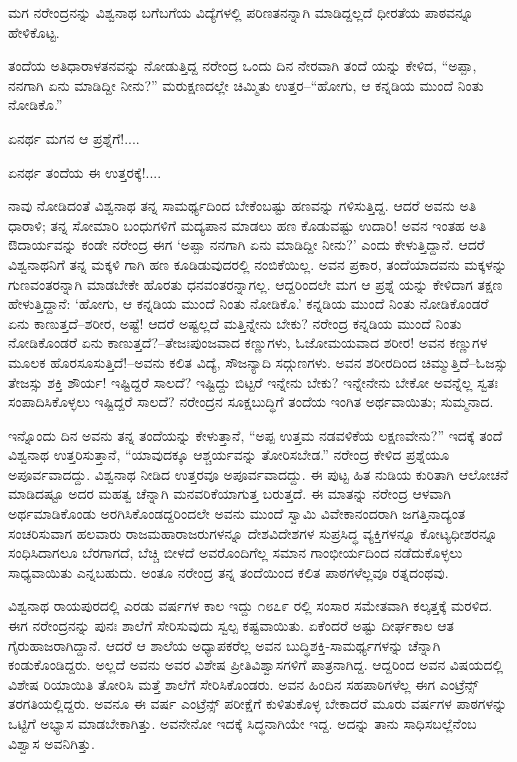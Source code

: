 ಮಗ ನರೇಂದ್ರನನ್ನು ವಿಶ್ವನಾಥ ಬಗೆಬಗೆಯ ವಿದ್ಯೆಗಳಲ್ಲಿ ಪರಿಣತನನ್ನಾಗಿ ಮಾಡಿದ್ದಲ್ಲದೆ ಧೀರತೆಯ ಪಾಠವನ್ನೂ ಹೇಳಿಕೊಟ್ಟ.

ತಂದೆಯ ಅತಿಧಾರಾಳತನವನ್ನು ನೋಡುತ್ತಿದ್ದ ನರೇಂದ್ರ ಒಂದು ದಿನ ನೇರವಾಗಿ ತಂದೆ ಯನ್ನು ಕೇಳಿದ, “ಅಪ್ಪಾ, ನನಗಾಗಿ ಏನು ಮಾಡಿದ್ದೀ ನೀನು?” ಮರುಕ್ಷಣದಲ್ಲೇ ಚಿಮ್ಮಿತು ಉತ್ತರ–“ಹೋಗು, ಆ ಕನ್ನಡಿಯ ಮುಂದೆ ನಿಂತು ನೋಡಿಕೊ.”

ಏನರ್ಥ ಮಗನ ಆ ಪ್ರಶ್ನೆಗೆ!....

ಏನರ್ಥ ತಂದೆಯ ಈ ಉತ್ತರಕ್ಕೆ!....

ನಾವು ನೋಡಿದಂತೆ ವಿಶ್ವನಾಥ ತನ್ನ ಸಾಮರ್ಥ್ಯದಿಂದ ಬೇಕೆಂಬಷ್ಟು ಹಣವನ್ನು ಗಳಿಸುತ್ತಿದ್ದ. ಆದರೆ ಅವನು ಅತಿ ಧಾರಾಳಿ; ತನ್ನ ಸೋಮಾರಿ ಬಂಧುಗಳಿಗೆ ಮದ್ಯಪಾನ ಮಾಡಲು ಹಣ ಕೊಡುವಷ್ಟು ಉದಾರಿ! ಅವನ ಇಂತಹ ಅತಿ ಔದಾರ್ಯವನ್ನು ಕಂಡೇ ನರೇಂದ್ರ ಈಗ ‘ಅಪ್ಪಾ ನನಗಾಗಿ ಏನು ಮಾಡಿದ್ದೀ ನೀನು?’ ಎಂದು ಕೇಳುತ್ತಿದ್ದಾನೆ. ಆದರೆ ವಿಶ್ವನಾಥನಿಗೆ ತನ್ನ ಮಕ್ಕಳಿ ಗಾಗಿ ಹಣ ಕೂಡಿಡುವುದರಲ್ಲಿ ನಂಬಿಕೆಯಿಲ್ಲ. ಅವನ ಪ್ರಕಾರ, ತಂದೆಯಾದವನು ಮಕ್ಕಳನ್ನು ಗುಣವಂತರನ್ನಾಗಿ ಮಾಡಬೇಕೇ ಹೊರತು ಧನವಂತರನ್ನಾಗಲ್ಲ. ಆದ್ದರಿಂದಲೇ ಮಗ ಆ ಪ್ರಶ್ನೆ ಯನ್ನು ಕೇಳಿದಾಗ ತಕ್ಷಣ ಹೇಳುತ್ತಿದ್ದಾನೆ: ‘ಹೋಗು, ಆ ಕನ್ನಡಿಯ ಮುಂದೆ ನಿಂತು ನೋಡಿಕೊ.’ ಕನ್ನಡಿಯ ಮುಂದೆ ನಿಂತು ನೋಡಿಕೊಂಡರೆ ಏನು ಕಾಣುತ್ತದೆ–ಶರೀರ, ಅಷ್ಟೆ! ಆದರೆ ಅಷ್ಟಲ್ಲದೆ ಮತ್ತಿನ್ನೇನು ಬೇಕು? ನರೇಂದ್ರ ಕನ್ನಡಿಯ ಮುಂದೆ ನಿಂತು ನೋಡಿಕೊಂಡರೆ ಏನು ಕಾಣುತ್ತದೆ?–ತೇಜಃಪುಂಜವಾದ ಕಣ್ಣುಗಳು, ಓಜೋಮಯವಾದ ಶರೀರ! ಅವನ ಕಣ್ಣುಗಳ ಮೂಲಕ ಹೊರಸೂಸುತ್ತಿದೆ!–ಅವನು ಕಲಿತ ವಿದ್ಯೆ, ಸೌಜನ್ಯಾದಿ ಸದ್ಗುಣಗಳು. ಅವನ ಶರೀರದಿಂದ ಚಿಮ್ಮುತ್ತಿದೆ–ಓಜಸ್ಸು ತೇಜಸ್ಸು ಶಕ್ತಿ ಶೌರ್ಯ! ಇಷ್ಟಿದ್ದರೆ ಸಾಲದೆ? ಇಷ್ಟಿದ್ದು ಬಿಟ್ಟರೆ ಇನ್ನೇನು ಬೇಕು? ಇನ್ನೇನೇನು ಬೇಕೋ ಅವನ್ನೆಲ್ಲ ಸ್ವತಃ ಸಂಪಾದಿಸಿಕೊಳ್ಳಲು ಇಷ್ಟಿದ್ದರೆ ಸಾಲದೆ? ನರೇಂದ್ರನ ಸೂಕ್ಷಬುದ್ಧಿಗೆ ತಂದೆಯ ಇಂಗಿತ ಅರ್ಥವಾಯಿತು; ಸುಮ್ಮನಾದ.

ಇನ್ನೊಂದು ದಿನ ಅವನು ತನ್ನ ತಂದೆಯನ್ನು ಕೇಳುತ್ತಾನೆ, “ಅಪ್ಪ ಉತ್ತಮ ನಡವಳಿಕೆಯ ಲಕ್ಷಣವೇನು?” ಇದಕ್ಕೆ ತಂದೆ ವಿಶ್ವನಾಥ ಉತ್ತರಿಸುತ್ತಾನೆ, “ಯಾವುದಕ್ಕೂ ಆಶ್ಚರ್ಯವನ್ನು ತೋರಿಸಬೇಡ.” ನರೇಂದ್ರ ಕೇಳಿದ ಪ್ರಶ್ನೆಯೂ ಅಪೂರ್ವವಾದದ್ದು. ವಿಶ್ವನಾಥ ನೀಡಿದ ಉತ್ತರವೂ ಅಪೂರ್ವವಾದದ್ದು. ಈ ಪುಟ್ಟ ಹಿತ ನುಡಿಯ ಕುರಿತಾಗಿ ಆಲೋಚನೆ ಮಾಡಿದಷ್ಟೂ ಅದರ ಮಹತ್ವ ಚೆನ್ನಾಗಿ ಮನವರಿಕೆಯಾಗುತ್ತ ಬರುತ್ತದೆ. ಈ ಮಾತನ್ನು ನರೇಂದ್ರ ಆಳವಾಗಿ ಅರ್ಥಮಾಡಿಕೊಂಡು ಅರಗಿಸಿಕೊಂಡದ್ದರಿಂದಲೇ ಅವನು ಮುಂದೆ ಸ್ವಾಮಿ ವಿವೇಕಾನಂದರಾಗಿ ಜಗತ್ತಿನಾದ್ಯಂತ ಸಂಚರಿಸುವಾಗ ಹಲವಾರು ರಾಜಮಹಾರಾಜರುಗಳನ್ನೂ ದೇಶವಿದೇಶಗಳ ಸುಪ್ರಸಿದ್ಧ ವ್ಯಕ್ತಿಗಳನ್ನೂ ಕೋಟ್ಯಧೀಶರನ್ನೂ ಸಂಧಿಸಿದಾಗಲೂ ಬೆರಗಾಗದೆ, ಬೆಚ್ಚಿ ಬೀಳದೆ ಅವರೊಂದಿಗೆಲ್ಲ ಸಮಾನ ಗಾಂಭೀರ್ಯದಿಂದ ನಡೆದುಕೊಳ್ಳಲು ಸಾಧ್ಯವಾಯಿತು ಎನ್ನಬಹುದು. ಅಂತೂ ನರೇಂದ್ರ ತನ್ನ ತಂದೆಯಿಂದ ಕಲಿತ ಪಾಠಗಳೆಲ್ಲವೂ ರತ್ನದಂಥವು.

ವಿಶ್ವನಾಥ ರಾಯಪುರದಲ್ಲಿ ಎರಡು ವರ್ಷಗಳ ಕಾಲ ಇದ್ದು ೧೮೭೯ ರಲ್ಲಿ ಸಂಸಾರ ಸಮೇತವಾಗಿ ಕಲ್ಕತ್ತಕ್ಕೆ ಮರಳಿದ. ಈಗ ನರೇಂದ್ರನನ್ನು ಪುನಃ ಶಾಲೆಗೆ ಸೇರಿಸುವುದು ಸ್ವಲ್ಪ ಕಷ್ಟವಾಯಿತು. ಏಕೆಂದರೆ ಅಷ್ಟು ದೀರ್ಘಕಾಲ ಆತ ಗೈರುಹಾಜರಾಗಿದ್ದಾನೆ. ಆದರೆ ಆ ಶಾಲೆಯ ಅಧ್ಯಾಪಕರೆಲ್ಲ ಅವನ ಬುದ್ಧಿಶಕ್ತಿ-ಸಾಮರ್ಥ್ಯಗಳನ್ನು ಚೆನ್ನಾಗಿ ಕಂಡುಕೊಂಡಿದ್ದರು. ಅಲ್ಲದೆ ಅವನು ಅವರ ವಿಶೇಷ ಪ್ರೀತಿವಿಶ್ವಾಸಗಳಿಗೆ ಪಾತ್ರನಾಗಿದ್ದ. ಆದ್ದರಿಂದ ಅವನ ವಿಷಯದಲ್ಲಿ ವಿಶೇಷ ರಿಯಾಯಿತಿ ತೋರಿಸಿ ಮತ್ತೆ ಶಾಲೆಗೆ ಸೇರಿಸಿಕೊಂಡರು. ಅವನ ಹಿಂದಿನ ಸಹಪಾಠಿಗಳೆಲ್ಲ ಈಗ ಎಂಟ್ರೆನ್ಸ್ ತರಗತಿಯಲ್ಲಿದ್ದರು. ಅವನೂ ಈ ವರ್ಷ ಎಂಟ್ರೆನ್ಸ್ ಪರೀಕ್ಷೆಗೆ ಕುಳಿತುಕೊಳ್ಳ ಬೇಕಾದರೆ ಮೂರು ವರ್ಷಗಳ ಪಾಠಗಳನ್ನು ಒಟ್ಟಿಗೆ ಅಭ್ಯಾಸ ಮಾಡಬೇಕಾಗಿತ್ತು. ಅವನೇನೋ ಇದಕ್ಕೆ ಸಿದ್ಧನಾಗಿಯೇ ಇದ್ದ. ಅದನ್ನು ತಾನು ಸಾಧಿಸಬಲ್ಲೆನೆಂಬ ವಿಶ್ವಾಸ ಅವನಿಗಿತ್ತು.

